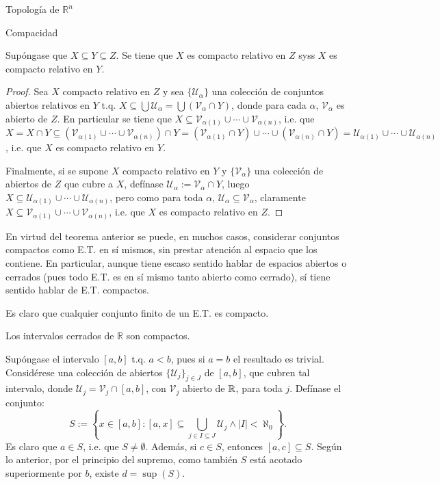 \begin{chapter}{Topología de $\mathbb{R}^n$}
\begin{section}{Compacidad}
\begin{them}
Supóngase que $X\subseteq Y\subseteq Z$. Se tiene que $X$ es compacto relativo en $Z$ syss $X$ es compacto relativo en $Y$.
\end{them}

\begin{proof}
Sea $X$ compacto relativo en $Z$ y sea $\{\mathcal{U}_\alpha\}$ una colección de conjuntos abiertos relativos en $Y$ t.q. $X\subseteq\bigcup\mathcal{U}_\alpha=\bigcup\left(\mathcal{V}_\alpha\cap Y\right)$, donde para cada $\alpha$, $\mathcal{V}_\alpha$ es abierto de $Z$. En particular se tiene que $X\subseteq\mathcal{V}_{\alpha(1)}\cup\cdots\cup\mathcal{V}_{\alpha(n)}$, i.e. que $X=X \cap Y\subseteq(\mathcal{V}_{\alpha(1)}\cup\cdots\cup\mathcal{V}_{\alpha(n)})\cap Y=(\mathcal{V}_{\alpha(1)}\cap Y)\cup\cdots\cup(\mathcal{V}_{\alpha(n)}\cap Y)=\mathcal{U}_{\alpha(1)}\cup\cdots\cup\mathcal{U}_{\alpha(n)}$, i.e. que $X$ es compacto relativo en $Y$.

Finalmente, si se supone $X$ compacto relativo en $Y$ y $\{\mathcal{V}_\alpha\}$ una colección de abiertos de $Z$ que cubre a $X$, defínase $\mathcal{U}_\alpha:=\mathcal{V}_\alpha\cap Y$, luego $X\subseteq\mathcal{U}_{\alpha(1)}\cup\cdots\cup\mathcal{U}_{\alpha(n)}$, pero como para toda $\alpha$, $\mathcal{U}_\alpha\subseteq\mathcal{V}_\alpha$, claramente $X\subseteq\mathcal{V}_{\alpha(1)}\cup\cdots\cup\mathcal{V}_{\alpha(n)}$, i.e. que $X$ es compacto relativo en $Z$.
\end{proof}

En virtud del teorema anterior se puede, en muchos casos, considerar conjuntos compactos como E.T. en sí mismos, sin prestar atención al espacio que los contiene. En particular, aunque tiene escaso sentido hablar de espacios abiertos o cerrados (pues todo E.T. es en sí mismo tanto abierto como cerrado), sí tiene sentido hablar de E.T. compactos. 

\begin{exmp}
Es claro que cualquier conjunto finito de un E.T. es compacto.
\end{exmp}

\begin{exmp}
Los intervalos cerrados de $\mathbb{R}$ son compactos.

Supóngase el intervalo $[a,b]$ t.q. $a<b$, pues si $a=b$ el resultado es trivial. Considérese una colección de abiertos $\{\mathcal{U}_j\}_{j\in J}$ de $[a,b]$, que cubren tal intervalo, donde $\mathcal{U}_j=\mathcal{V}_j\cap[a,b]$, con $\mathcal{V}_j$ abierto de $\mathbb{R}$, para toda $j$. Defínase el conjunto: $$S:=\left\lbrace x\in[a,b]:[a,x]\subseteq\bigcup_{j\in I\subseteq J}\mathcal{U}_j\wedge|I|<\aleph_0\right\rbrace.$$ Es claro que $a\in S$, i.e. que $S\neq\emptyset$. Además, si $c\in S$, entonces $[a,c]\subseteq S$. Según lo anterior, por el principio del supremo, como también $S$ está acotado superiormente por $b$, existe $d=\sup(S)$.
\end{exmp}


\end{section}
\end{chapter}
